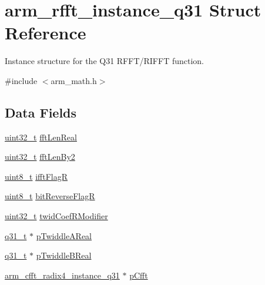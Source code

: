 \hypertarget{structarm__rfft__instance__q31}{\section{arm\-\_\-rfft\-\_\-instance\-\_\-q31 Struct Reference}
\label{structarm__rfft__instance__q31}
}


Instance structure for the Q31 R\-F\-F\-T/\-R\-I\-F\-F\-T function.  




{\ttfamily \#include $<$arm\-\_\-math.\-h$>$}

\subsection*{Data Fields}
\begin{DoxyCompactItemize}
\item 
\hyperlink{stdint_8h_a435d1572bf3f880d55459d9805097f62}{uint32\-\_\-t} \hyperlink{structarm__rfft__instance__q31_af777b0cadd5abaf064323692c2e6693b}{fft\-Len\-Real}
\item 
\hyperlink{stdint_8h_a435d1572bf3f880d55459d9805097f62}{uint32\-\_\-t} \hyperlink{structarm__rfft__instance__q31_a7d1a948bb8a23bf5419bb6f9ef43dd76}{fft\-Len\-By2}
\item 
\hyperlink{stdint_8h_aba7bc1797add20fe3efdf37ced1182c5}{uint8\-\_\-t} \hyperlink{structarm__rfft__instance__q31_af5c2615e6cde15524df38fa57ea32d94}{ifft\-Flag\-R}
\item 
\hyperlink{stdint_8h_aba7bc1797add20fe3efdf37ced1182c5}{uint8\-\_\-t} \hyperlink{structarm__rfft__instance__q31_a3cb90cdc928a88b0203917dcb3dc1b71}{bit\-Reverse\-Flag\-R}
\item 
\hyperlink{stdint_8h_a435d1572bf3f880d55459d9805097f62}{uint32\-\_\-t} \hyperlink{structarm__rfft__instance__q31_a6fc90252b579f7c29e01bd279334fc43}{twid\-Coef\-R\-Modifier}
\item 
\hyperlink{arm__math_8h_adc89a3547f5324b7b3b95adec3806bc0}{q31\-\_\-t} $\ast$ \hyperlink{structarm__rfft__instance__q31_a2a0c944e66bab92fcbe19d1c29153250}{p\-Twiddle\-A\-Real}
\item 
\hyperlink{arm__math_8h_adc89a3547f5324b7b3b95adec3806bc0}{q31\-\_\-t} $\ast$ \hyperlink{structarm__rfft__instance__q31_ae5070be4c2e0327e618f5e1f4c5b9d80}{p\-Twiddle\-B\-Real}
\item 
\hyperlink{structarm__cfft__radix4__instance__q31}{arm\-\_\-cfft\-\_\-radix4\-\_\-instance\-\_\-q31} $\ast$ \hyperlink{structarm__rfft__instance__q31_ac6bf12707e1985818d161616adf27977}{p\-Cfft}
\end{DoxyCompactItemize}


